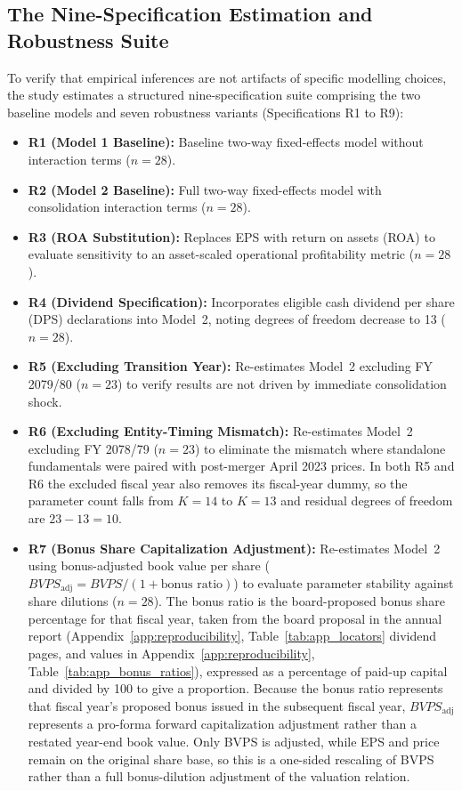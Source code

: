 \subsection{The Nine-Specification Estimation and Robustness Suite}
To verify that empirical inferences are not artifacts of specific modelling choices, the study estimates a structured nine-specification suite comprising the two baseline models and seven robustness variants (Specifications R1 to R9):
\begin{itemize}
    \item \textbf{R1 (Model 1 Baseline):} Baseline two-way fixed-effects model without interaction terms ($n = 28$).
    \item \textbf{R2 (Model 2 Baseline):} Full two-way fixed-effects model with consolidation interaction terms ($n = 28$).
    \item \textbf{R3 (ROA Substitution):} Replaces EPS with return on assets (ROA) to evaluate sensitivity to an asset-scaled operational profitability metric ($n = 28$).
    \item \textbf{R4 (Dividend Specification):} Incorporates eligible cash dividend per share (DPS) declarations into Model~2, noting degrees of freedom decrease to 13 ($n = 28$).
    \item \textbf{R5 (Excluding Transition Year):} Re-estimates Model~2 excluding FY 2079/80 ($n = 23$) to verify results are not driven by immediate consolidation shock.
    \item \textbf{R6 (Excluding Entity-Timing Mismatch):} Re-estimates Model~2 excluding FY 2078/79 ($n = 23$) to eliminate the mismatch where standalone fundamentals were paired with post-merger April 2023 prices. In both R5 and R6 the excluded fiscal year also removes its fiscal-year dummy, so the parameter count falls from $K = 14$ to $K = 13$ and residual degrees of freedom are $23 - 13 = 10$.
    \item \textbf{R7 (Bonus Share Capitalization Adjustment):} Re-estimates Model~2 using bonus-adjusted book value per share ($\mathit{BVPS}_{\text{adj}} = \mathit{BVPS} / (1 + \text{bonus ratio})$) to evaluate parameter stability against share dilutions ($n = 28$). The bonus ratio is the board-proposed bonus share percentage for that fiscal year, taken from the board proposal in the annual report (Appendix~\ref{app:reproducibility}, Table~\ref{tab:app_locators} dividend pages, and values in Appendix~\ref{app:reproducibility}, Table~\ref{tab:app_bonus_ratios}), expressed as a percentage of paid-up capital and divided by 100 to give a proportion. Because the bonus ratio represents that fiscal year's proposed bonus issued in the subsequent fiscal year, $\mathit{BVPS}_{\text{adj}}$ represents a pro-forma forward capitalization adjustment rather than a restated year-end book value. Only BVPS is adjusted, while EPS and price remain on the original share base, so this is a one-sided rescaling of BVPS rather than a full bonus-dilution adjustment of the valuation relation.

\end{itemize}

